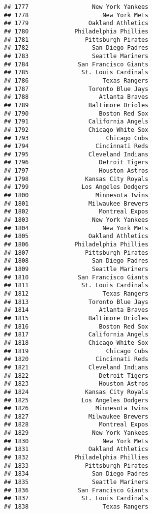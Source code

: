 \documentclass[]{article}
\begin{document}
\begin{verbatim}
## 1777                  New York Yankees
## 1778                     New York Mets
## 1779                 Oakland Athletics
## 1780             Philadelphia Phillies
## 1781                Pittsburgh Pirates
## 1782                  San Diego Padres
## 1783                  Seattle Mariners
## 1784              San Francisco Giants
## 1785               St. Louis Cardinals
## 1786                     Texas Rangers
## 1787                 Toronto Blue Jays
## 1788                    Atlanta Braves
## 1789                 Baltimore Orioles
## 1790                    Boston Red Sox
## 1791                 California Angels
## 1792                 Chicago White Sox
## 1793                      Chicago Cubs
## 1794                   Cincinnati Reds
## 1795                 Cleveland Indians
## 1796                    Detroit Tigers
## 1797                    Houston Astros
## 1798                Kansas City Royals
## 1799               Los Angeles Dodgers
## 1800                   Minnesota Twins
## 1801                 Milwaukee Brewers
## 1802                    Montreal Expos
## 1803                  New York Yankees
## 1804                     New York Mets
## 1805                 Oakland Athletics
## 1806             Philadelphia Phillies
## 1807                Pittsburgh Pirates
## 1808                  San Diego Padres
## 1809                  Seattle Mariners
## 1810              San Francisco Giants
## 1811               St. Louis Cardinals
## 1812                     Texas Rangers
## 1813                 Toronto Blue Jays
## 1814                    Atlanta Braves
## 1815                 Baltimore Orioles
## 1816                    Boston Red Sox
## 1817                 California Angels
## 1818                 Chicago White Sox
## 1819                      Chicago Cubs
## 1820                   Cincinnati Reds
## 1821                 Cleveland Indians
## 1822                    Detroit Tigers
## 1823                    Houston Astros
## 1824                Kansas City Royals
## 1825               Los Angeles Dodgers
## 1826                   Minnesota Twins
## 1827                 Milwaukee Brewers
## 1828                    Montreal Expos
## 1829                  New York Yankees
## 1830                     New York Mets
## 1831                 Oakland Athletics
## 1832             Philadelphia Phillies
## 1833                Pittsburgh Pirates
## 1834                  San Diego Padres
## 1835                  Seattle Mariners
## 1836              San Francisco Giants
## 1837               St. Louis Cardinals
## 1838                     Texas Rangers

\end{verbatim}
\end{document}
